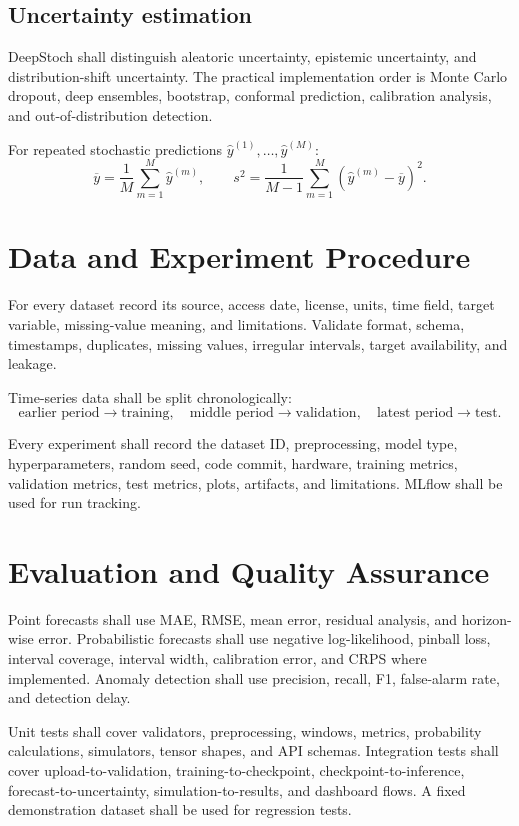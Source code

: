 \documentclass[11pt,a4paper]{report}
\begin{document}
\section{Uncertainty estimation}

DeepStoch shall distinguish aleatoric uncertainty, epistemic uncertainty, and distribution-shift uncertainty. The practical implementation order is Monte Carlo dropout, deep ensembles, bootstrap, conformal prediction, calibration analysis, and out-of-distribution detection.

For repeated stochastic predictions $\widehat y^{(1)},\ldots,\widehat y^{(M)}$:
\[
\overline y=\frac{1}{M}\sum_{m=1}^M\widehat y^{(m)},
\qquad
s^2=\frac{1}{M-1}\sum_{m=1}^M(\widehat y^{(m)}-\overline y)^2.
\]

\chapter{Data and Experiment Procedure}

For every dataset record its source, access date, license, units, time field, target variable, missing-value meaning, and limitations. Validate format, schema, timestamps, duplicates, missing values, irregular intervals, target availability, and leakage.

Time-series data shall be split chronologically:
\[
\text{earlier period}\rightarrow\text{training},
\quad
\text{middle period}\rightarrow\text{validation},
\quad
\text{latest period}\rightarrow\text{test}.
\]

Every experiment shall record the dataset ID, preprocessing, model type, hyperparameters, random seed, code commit, hardware, training metrics, validation metrics, test metrics, plots, artifacts, and limitations. MLflow shall be used for run tracking.

\chapter{Evaluation and Quality Assurance}

Point forecasts shall use MAE, RMSE, mean error, residual analysis, and horizon-wise error. Probabilistic forecasts shall use negative log-likelihood, pinball loss, interval coverage, interval width, calibration error, and CRPS where implemented. Anomaly detection shall use precision, recall, F1, false-alarm rate, and detection delay.

Unit tests shall cover validators, preprocessing, windows, metrics, probability calculations, simulators, tensor shapes, and API schemas. Integration tests shall cover upload-to-validation, training-to-checkpoint, checkpoint-to-inference, forecast-to-uncertainty, simulation-to-results, and dashboard flows. A fixed demonstration dataset shall be used for regression tests.
\end{document}
